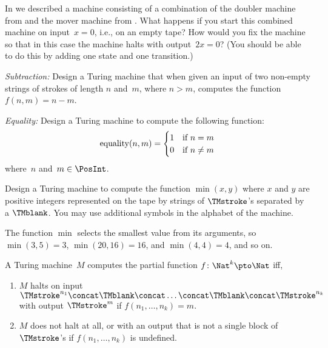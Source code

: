 \documentclass[../../../include/open-logic-section]{subfiles}
\begin{document}
\begin{prob}
In  we described a machine consisting
of a combination of the doubler machine from
 and the mover machine from
. What happens if you start this
combined machine on input~$x=0$, i.e., on an empty tape?  How would
you fix the machine so that in this case the machine halts with
output~$2x=0$? (You should be able to do this by adding one state and
one transition.)
\end{prob}

\begin{prob}
\emph{Subtraction:} Design a Turing machine that when given an input
of two non-empty strings of strokes of length $n$ and~$m$, where $n >
m$, computes the function $f(n,m) = n - m$.
\end{prob}

\begin{prob}
\emph{Equality:} Design a Turing machine to compute the following function:
\[
\mathrm{equality}(n,m) = 
\begin{cases}
  \text{1} & \text{if~$n = m$} \\
  \text{0} & \text{if~$n \neq m$}
\end{cases}
\]
where~$n$ and~$m \in \PosInt$.
\end{prob}

\begin{prob}
Design a Turing machine to compute the function $\min(x,y)$ where $x$
and $y$ are positive integers represented on the tape by strings of
$\TMstroke$'s separated by a $\TMblank$. You may use additional
symbols in the alphabet of the machine.

The function $\min$ selects the smallest value from its arguments, so
$\min(3,5)=3$, $\min(20,16)=16$, and $\min(4,4)=4$, and so on.
\end{prob}

\begin{defn}
  A Turing machine~$M$ computes the partial function $f\colon \Nat^k
  \pto \Nat$ iff, 
  \begin{enumerate}
    \item $M$ halts on input $\TMstroke^{n_1}\concat\TMblank\concat
    \dots \concat\TMblank\concat\TMstroke^{n_k}$ with output $\TMstroke^{m}$ if $f(n_1, \dots, n_k) = m$.
    \item $M$ does not halt at all, or with an output that is not a
    single block of~$\TMstroke$'s if $f(n_1, \dots, n_k)$ is undefined.
  \end{enumerate}
\end{defn}
\end{document}
